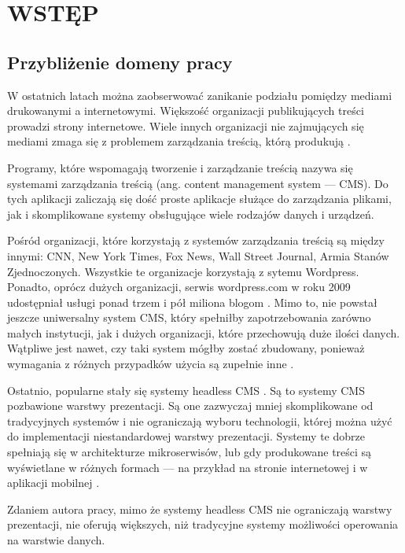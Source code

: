 \section{WSTĘP}

\subsection{Przybliżenie domeny pracy}

W ostatnich latach można zaobserwować zanikanie podziału pomiędzy mediami
drukowanymi a internetowymi. Większość organizacji publikujących treści prowadzi
strony internetowe. Wiele innych organizacji nie zajmujących się mediami zmaga
się z problemem zarządzania treścią, którą produkują \cite{Mauthe_2004}. 

Programy, które wspomagają tworzenie i zarządzanie treścią nazywa się systemami
zarządzania treścią (ang. content management system — CMS). Do tych aplikacji
zaliczają się dość proste aplikacje służące do zarządzania plikami, jak i
skomplikowane systemy obsługujące wiele rodzajów danych i urządzeń.

Pośród organizacji, które korzystają z systemów zarządzania treścią są między
innymi: CNN, New York Times, Fox News, Wall Street Journal, Armia Stanów
Zjednoczonych. Wszystkie te organizacje korzystają z sytemu Wordpress. Ponadto,
oprócz dużych organizacji, serwis wordpress.com w roku 2009 udostępniał usługi
ponad trzem i pół miliona blogom \cite{brazell2010wordpress}. Mimo to, nie
powstał jeszcze uniwersalny system CMS, który spełniłby zapotrzebowania zarówno
małych instytucji, jak i dużych organizacji, które przechowują duże ilości
danych. Wątpliwe jest nawet, czy taki system mógłby zostać zbudowany, ponieważ
wymagania z różnych przypadków użycia są zupełnie inne \cite{Mauthe_2004}.

\vspace{.5cm}

Ostatnio, popularne stały się systemy headless CMS \cite{WhyHeadlessCMS}. Są to
systemy CMS pozbawione warstwy prezentacji. Są one zazwyczaj mniej skomplikowane
od tradycyjnych systemów i nie ograniczają wyboru technologii, której można użyć
do implementacji niestandardowej warstwy prezentacji. Systemy te dobrze
spełniają się w architekturze mikroserwisów, lub gdy produkowane treści są
wyświetlane w różnych formach — na przykład na stronie internetowej i w
aplikacji mobilnej \cite{WhyHeadlessCMS}.

Zdaniem autora pracy, mimo że systemy headless CMS nie ograniczają warstwy
prezentacji, nie oferują większych, niż tradycyjne systemy możliwości
operowania na warstwie danych. 

